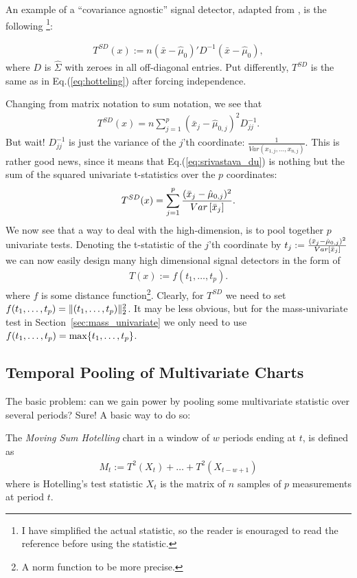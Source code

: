An example of a ``covariance agnostic'' signal detector, adapted from \cite{srivastava_test_2008}, is the following \footnote{I have simplified the actual statistic, so the reader is enouraged to read the reference before using the statistic.}:
\begin{definition}
\begin{align}
\label{eq:srivastava_du}
	 	T^{SD}(x) := n (\bar{x}-\hat{\mu}_0)' D^{-1} (\bar{x}-\hat{\mu}_0),
\end{align}
where $D$ is $\hat{\Sigma}$ with zeroes in all off-diagonal entries. Put differently, $T^{SD}$ is the same as \tsq in Eq.(\ref{eq:hotteling}) after forcing independence.
\end{definition}
Changing from matrix notation to sum notation, we see that 
\begin{align}
	 	T^{SD}(x) = n \sum_{j=1}^p (\bar{x}_j - \hat{\mu}_{0,j})^2 D^{-1}_{jj} .
\end{align}
But wait! 
$D^{-1}_{jj}$ is just the variance of the $j$'th coordinate: $\frac{1}{Var(x_{1,j},\dots,x_{n,j})}$.
This is rather good news, since it means that Eq.(\ref{eq:srivastava_du}) is nothing but the sum of the squared univariate t-statistics over the $p$ coordinates:
\begin{align}
	 	T^{SD}(x) =  \sum_{j=1}^p \frac{(\bar{x}_j - \hat{\mu}_{0,j})^2}{\mathop{Var} \left[ \bar{x}_j \right]}  .
\end{align}
We now see that a way to deal with the high-dimension, is to pool together $p$ univariate tests.
Denoting the t-statistic of the $j$'th coordinate by $t_j:= \frac{(\bar{x}_j - \hat{\mu}_{0,j})^2}{\mathop{Var} \left[ \bar{x}_j \right]}$ we can now easily design many high dimensional signal detectors in the form of
\begin{align}
	 	T(x) :=  f(t_1,\dots,t_p) .
\end{align}
where $f$ is some distance function\footnote{A norm function to be more precise.}.
Clearly, for $T^{SD}$ we need to set $f(t_1,\dots,t_p) = \Vert (t_1,\dots,t_p) \Vert_2^2$.
It may be less obvious, but for the mass-univariate test in Section~\ref{sec:mass_univariate} we only need to use $f(t_1,\dots,t_p)=\max\{ t_1,\dots,t_p \}$.



\subsection{Temporal Pooling of Multivariate Charts}
The basic problem: can we gain power by pooling some multivariate statistic over several periods?
Sure!
A basic way to do so:
\begin{definition}
The \emph{Moving Sum Hotelling} chart in a window of $w$ periods ending at $t$, is defined as
\begin{align}
	M_t:= T^2(X_t)+\dots+T^2(X_{t-w+1})
\end{align}
where \tsq is Hotelling's test statistic $X_t$ is the matrix of $n$ samples of $p$ measurements at period $t$. 
\end{definition}

